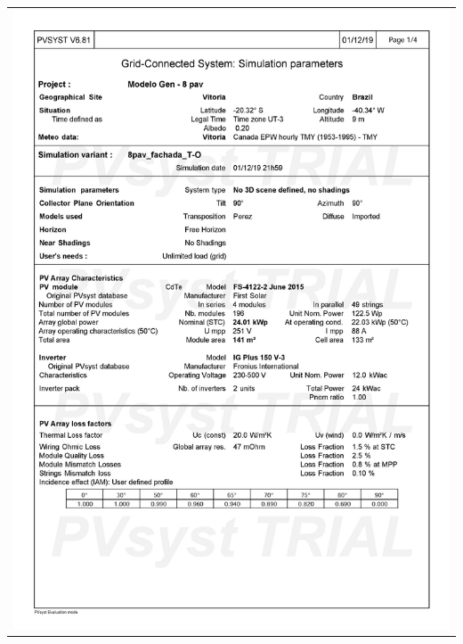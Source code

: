 \begin{table}[H]
    \centering
    \begin{tabular}{l}
        \includegraphics[width=\textwidth]{figures/attachments/resultpv13.jpg}
    \end{tabular}
\end{table}
\pagebreak
